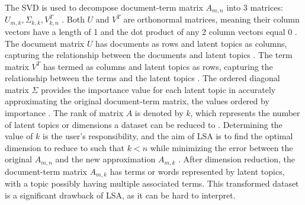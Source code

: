 \documentclass[12pt]{article}
\begin{document}
The SVD is used to decompose document-term matrix $A_{m,n}$ into 3 matrices: $U_{m,k}, \Sigma_{k,k}, V^{T}_{k,n}$ \parencite{Sumedha_2018}. Both $U$ and $V^{T}$ are orthonormal matrices, meaning their column vectors have a length of 1 and the dot product of any 2 column vectors equal 0 \parencite{Sumedha_2018}. The document matrix $U$ has documents as rows and latent topics as columns, capturing the relationship between the documents and latent topics \parencite{Sumedha_2018}. The term matrix $V^{T}$ has termed as columns and latent topics as rows, capturing the relationship between the terms and the latent topics \parencite{Sumedha_2018}. The ordered diagonal matrix $\Sigma$ provides the importance value for each latent topic in accurately approximating the original document-term matrix, the values ordered by importance \parencite{Sumedha_2018}. The rank of matrix $A$ is denoted by $k$, which represents the number of latent topics or dimensions a dataset can be reduced to \parencite{Sumedha_2018}. Determining the value of $k$ is the user's responsibility, and the aim of LSA is to find the optimal dimension to reduce to such that $k < n$ while minimizing the error between the original $A_{m,n}$ and the new approximation $A_{m,k}$ \parencite{Sumedha_2018}. After dimension reduction, the document-term matrix $A_{m,k}$ has terms or words represented by latent topics, with a topic possibly having multiple associated terms. This transformed dataset is a significant drawback of LSA, as it can be hard to interpret.
\end{document}
